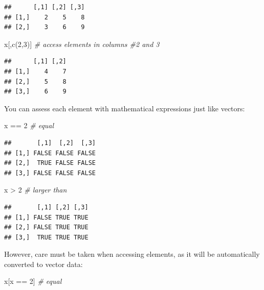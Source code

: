 \documentclass[
]{book}
\newenvironment{Shaded}{\begin{snugshade}}{\end{snugshade}}
\newcommand{\CommentTok}[1]{\textcolor[rgb]{0.56,0.35,0.01}{\textit{#1}}}
\newcommand{\DecValTok}[1]{\textcolor[rgb]{0.00,0.00,0.81}{#1}}
\newcommand{\FunctionTok}[1]{\textcolor[rgb]{0.00,0.00,0.00}{#1}}
\newcommand{\NormalTok}[1]{#1}
\newcommand{\SpecialCharTok}[1]{\textcolor[rgb]{0.00,0.00,0.00}{#1}}
\begin{document}
\begin{verbatim}
##      [,1] [,2] [,3]
## [1,]    2    5    8
## [2,]    3    6    9
\end{verbatim}

\begin{Shaded}
\begin{Highlighting}[]
\NormalTok{x[,}\FunctionTok{c}\NormalTok{(}\DecValTok{2}\NormalTok{,}\DecValTok{3}\NormalTok{)] }\CommentTok{\# access elements in columns \#2 and 3}
\end{Highlighting}
\end{Shaded}

\begin{verbatim}
##      [,1] [,2]
## [1,]    4    7
## [2,]    5    8
## [3,]    6    9
\end{verbatim}

You can assess each element with mathematical expressions just like vectors:

\begin{Shaded}
\begin{Highlighting}[]
\NormalTok{x }\SpecialCharTok{==} \DecValTok{2} \CommentTok{\# equal}
\end{Highlighting}
\end{Shaded}

\begin{verbatim}
##       [,1]  [,2]  [,3]
## [1,] FALSE FALSE FALSE
## [2,]  TRUE FALSE FALSE
## [3,] FALSE FALSE FALSE
\end{verbatim}

\begin{Shaded}
\begin{Highlighting}[]
\NormalTok{x }\SpecialCharTok{\textgreater{}} \DecValTok{2} \CommentTok{\# larger than}
\end{Highlighting}
\end{Shaded}

\begin{verbatim}
##       [,1] [,2] [,3]
## [1,] FALSE TRUE TRUE
## [2,] FALSE TRUE TRUE
## [3,]  TRUE TRUE TRUE
\end{verbatim}

However, care must be taken when accessing elements, as it will be automatically converted to vector data:

\begin{Shaded}
\begin{Highlighting}[]
\NormalTok{x[x }\SpecialCharTok{==} \DecValTok{2}\NormalTok{] }\CommentTok{\# equal}
\end{Highlighting}
\end{Shaded}
\end{document}
